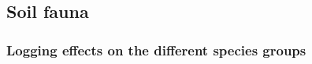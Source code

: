


\subsection*{Soil fauna}
\label{disc:soil_fauna}


\subsubsection*{Logging effects on the different species groups}
\label{disc:logging_effects}


